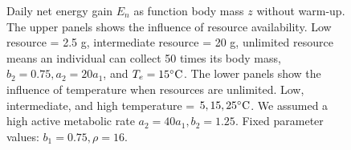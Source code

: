 \begin{figure}[H]
\begin{center}
\caption{
      Daily net energy gain  $E_n$ as function body mass $z$ without warm-up.
	The upper panels shows the influence of resource availability.
	Low resource = 2.5 g, intermediate resource = 20 g, unlimited resource means an individual can collect 50 times its body mass, $b_2 = 0.75, a_2 = 20 a_1$, and $T_e = 15 ^{\circ} \rm{C}$. 
	The lower panels show the influence of temperature when resources are unlimited.
	Low, intermediate, and high temperature = $5, 15, 25 ^{\circ} \rm{C}$.
	We assumed a high active metabolic rate $a_2 = 40 a_1, b_2  = 1.25$.
	Fixed parameter values: $b_1 = 0.75, \rho = 16$.
}
\label{fig2}
\end{center}
\end{figure}
\newpage
%
